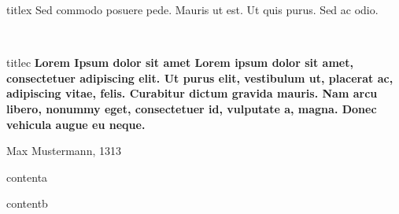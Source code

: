 \documentclass[a4paper,11pt]{tubsposter}
\begin{document}
\sffamily



\begin{dynamiccontents*}{titlex}
\rmfamily\fontsize{32}{38}\selectfont Sed commodo posuere pede.
Mauris ut est.
Ut quis purus. Sed ac odio.
\end{dynamiccontents*}



~
\newpage
~



\begin{dynamiccontents*}{titlec}
\leavevmode\color{tuBlueDark}\bfseries\Large
\glqq Lorem Ipsum dolor sit amet Lorem ipsum dolor sit amet, consectetuer
adipiscing elit. Ut purus elit, vestibulum ut, placerat ac, adipiscing vitae,
felis. Curabitur dictum gravida mauris. Nam arcu libero, nonummy eget,
consectetuer id, vulputate a, magna. Donec vehicula augue eu neque.\grqq\smallskip\\
\parbox{\textwidth}{\hfill\large Max Mustermann, 1313}
\end{dynamiccontents*}


\begin{dynamiccontents*}{contenta}
\lipsum[2]
\end{dynamiccontents*}
\begin{dynamiccontents*}{contentb}
\lipsum[3]
\end{dynamiccontents*}
\end{document}
